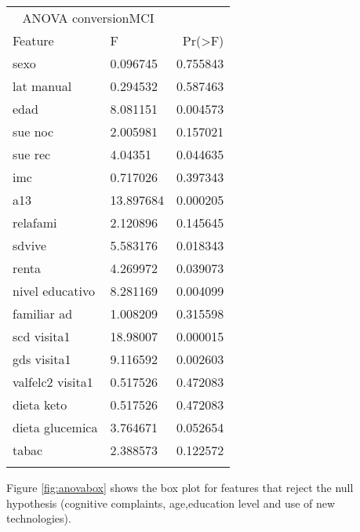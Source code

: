 \documentclass[11pt]{article}
\begin{document}
\begin{tabular}{llr}
\hline
\multicolumn{2}{c}{ANOVA conversionMCI} \\
\cline{1-2}
Feature    & F & Pr(>F) \\
\hline
sexo      & 0.096745   & 0.755843        \\
lat manual  & 0.294532 & 0.587463       \\
edad        & 8.081151 & 0.004573      \\
sue noc & 2.005981    & 0.157021       \\
sue rec & 4.04351     & 0.044635        \\
imc & 0.717026        & 0.397343        \\
a13 & 13.897684       & 0.000205        \\
relafami & 2.120896   & 0.145645        \\
sdvive & 5.583176     & 0.018343        \\
renta & 4.269972  & 0.039073      \\
nivel educativo & 8.281169     & 0.004099         \\
familiar ad & 1.008209       & 0.315598        \\
scd visita1 & 18.98007       & 0.000015       \\
gds visita1 & 9.116592       & 0.002603       \\
valfelc2 visita1 & 0.517526      & 0.472083       \\
dieta keto & 0.517526      & 0.472083       \\
dieta glucemica & 3.764671 & 0.052654 \\
tabac &  2.388573  & 0.122572 \\
\hline
\label{tab:anova}
\end{tabular}

Figure \ref{fig:anovabox} shows the box plot for features that reject the null hypothesis (cognitive complaints, age,education level and use of new technologies).
\end{document}
